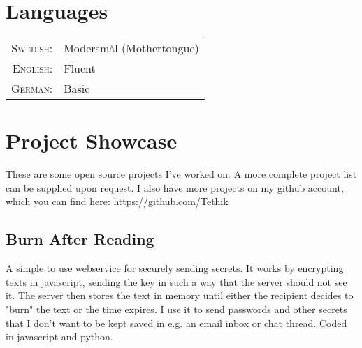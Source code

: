 \documentclass[a4paper,10pt]{article}
\begin{document}
\section{Languages}
\begin{tabular}{rl}
\textsc{Swedish:}& Modersmål (Mothertongue)\\
\textsc{English:}& Fluent\\
\textsc{German:}& Basic\\
\end{tabular}



\newpage

\section{Project Showcase}
These are some open source projects I've worked on. A more complete project list can be supplied upon request. I also have more projects on my github account, which you can find here: \href{https://github.com/Tethik}{https://github.com/Tethik}\\

\subsection{Burn After Reading}
A simple to use webservice for securely sending secrets. It works by encrypting texts in javascript, sending the key in such a way that the server should not see it. The server then stores the text in memory until either the recipient decides to "burn" the text or the time expires. I use it to send passwords and other secrets that I don't want to be kept saved in e.g. an email inbox or chat thread. Coded in javascript and python.
\end{document}
